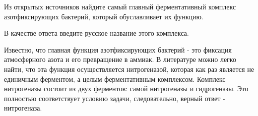 
Из открытых источников найдите самый главный ферментативный комплекс азотфиксирующих бактерий, который обуславливает их функцию.

В качестве ответа введите русское название этого комплекса.

\explanationSection

Известно, что главная функция азотфиксирующих бактерий - это фиксация атмосферного азота и его превращение в аммиак. В литературе можно легко найти, что эта функция осуществляется нитрогеназой, которая как раз является не единичным ферментом, а целым ферментативным комплексом. Комплекс нитрогеназы состоит из двух ферментов: самой нитрогеназы и гидрогеназы. Это полностью соответствует условию задачи, следовательно, верный ответ - нитрогеназа.

